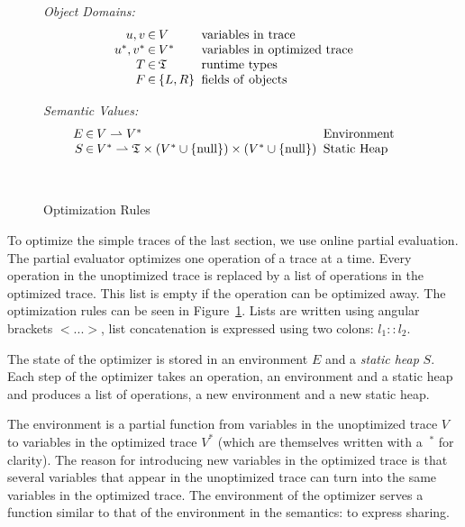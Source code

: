 \documentclass{sigplanconf}
\begin{document}
\begin{figure}
\begin{minipage}[b]{7 cm}
\emph{Object Domains:}
$$\setlength\arraycolsep{0.1em}
 \begin{array}{rcll}
    u,v & \in & V & \mathrm{\ variables\ in\ trace}\\
    u^*,v^* & \in & V^* & \mathrm{\ variables\ in\ optimized\ trace}\\
    T & \in & \mathfrak{T} & \mathrm{\ runtime\ types}\\
    F & \in & \left\{ L,R\right\} & \mathrm{\ fields\ of\ objects}\\
 \end{array}
$$
\end{minipage}
\begin{minipage}[b]{5 cm}
\emph{Semantic Values:}
$$\setlength\arraycolsep{0.1em}
 \begin{array}{rcll}
    E & \in & V\rightharpoonup V^* & \mathrm{\ Environment}\\
    S & \in & V^*\rightharpoonup\mathfrak{T}\times(V^*\cup \{ \mathrm{null} \})\times (V^*\cup \{ \mathrm{null}\} ) & \mathrm{\ Static\ Heap}\\
    \\
    \\
 \end{array}
$$
\end{minipage}
\caption{Optimization Rules}
\label{fig:optimization}
\end{figure}

To optimize the simple traces of the last section, we use online partial
evaluation. The partial evaluator optimizes one operation of a trace at a
time. Every operation in the unoptimized trace is replaced by a list of
operations in the optimized trace. This list is empty if the operation can be
optimized away. The optimization rules can be seen in
Figure~\ref{fig:optimization}. Lists are written using angular brackets $<...>$,
list concatenation is expressed using two colons: $l_1::l_2$.

The state of the optimizer is stored in an environment $E$ and a \emph{static
heap} $S$. Each step of the optimizer takes an operation, an environment and a
static heap and produces a list of operations, a new environment and a new
static heap.

The environment is a partial function from variables in the
unoptimized trace $V$ to variables in the optimized trace $V^*$ (which are
themselves written with a
$\ ^*$ for clarity). The reason for introducing new variables in the optimized
trace is that several variables that appear in the unoptimized trace can turn
into the same variables in the optimized trace. The environment of the
optimizer serves a function similar to that of the environment in the
semantics: to express sharing.
\end{document}
